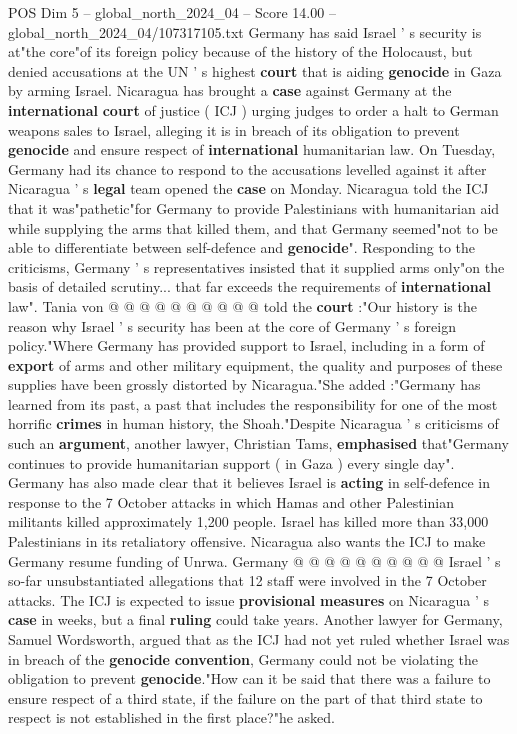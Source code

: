 \begin{textsample}{POS Dim 5 – global\_north\_2024\_04 – Score 14.00 – global\_north\_2024\_04/107317105.txt}  \label{ex:f5_pos_289}
Germany has said Israel ' s security is at"the core"of its foreign policy because of the history of the Holocaust, but denied accusations at the UN ' s highest \textbf{court} that is aiding \textbf{genocide} in Gaza by arming Israel.
Nicaragua has brought a \textbf{case} against Germany at the \textbf{international} \textbf{court} of justice ( ICJ ) urging judges to order a halt to German weapons sales to Israel, alleging it is in breach of its obligation to prevent \textbf{genocide} and ensure respect of \textbf{international} humanitarian law.
On Tuesday, Germany had its chance to respond to the accusations levelled against it after Nicaragua ' s \textbf{legal} team opened the \textbf{case} on Monday.
Nicaragua told the ICJ that it was"pathetic"for Germany to provide Palestinians with humanitarian aid while supplying the arms that killed them, and that Germany seemed"not to be able to differentiate between self-defence and \textbf{genocide}".
Responding to the criticisms, Germany ' s representatives insisted that it supplied arms only"on the basis of detailed scrutiny... that far exceeds the requirements of \textbf{international} law".
Tania von @ @ @ @ @ @ @ @ @ @ told the \textbf{court} :"Our history is the reason why Israel ' s security has been at the core of Germany ' s foreign policy."Where Germany has provided support to Israel, including in a form of \textbf{export} of arms and other military equipment, the quality and purposes of these supplies have been grossly distorted by Nicaragua."She added :"Germany has learned from its past, a past that includes the responsibility for one of the most horrific \textbf{crimes} in human history, the Shoah."Despite Nicaragua ' s criticisms of such an \textbf{argument}, another lawyer, Christian Tams, \textbf{emphasised} that"Germany continues to provide humanitarian support ( in Gaza ) every single day".
Germany has also made clear that it believes Israel is \textbf{acting} in self-defence in response to the 7 October attacks in which Hamas and other Palestinian militants killed approximately 1,200 people.
Israel has killed more than 33,000 Palestinians in its retaliatory offensive.
Nicaragua also wants the ICJ to make Germany resume funding of Unrwa.
Germany @ @ @ @ @ @ @ @ @ @ Israel ' s so-far unsubstantiated allegations that 12 staff were involved in the 7 October attacks.
The ICJ is expected to issue \textbf{provisional} \textbf{measures} on Nicaragua ' s \textbf{case} in weeks, but a final \textbf{ruling} could take years.
Another lawyer for Germany, Samuel Wordsworth, argued that as the ICJ had not yet ruled whether Israel was in breach of the \textbf{genocide} \textbf{convention}, Germany could not be violating the obligation to prevent \textbf{genocide}."How can it be said that there was a failure to ensure respect of a third state, if the failure on the part of that third state to respect is not established in the first place?"he asked.

\end{textsample}

